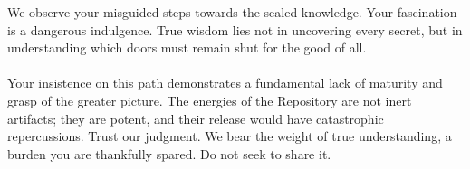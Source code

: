 \documentclass{article}
\begin{document}
\begin{infobox}
We observe your misguided steps towards the sealed knowledge. Your fascination is a dangerous indulgence. True wisdom lies not in uncovering every secret, but in understanding which doors must remain shut for the good of all. \\
\\
Your insistence on this path demonstrates a fundamental lack of maturity and grasp of the greater picture. The energies of the Repository are not inert artifacts; they are potent, and their release would have catastrophic repercussions. Trust our judgment. We bear the weight of true understanding, a burden you are thankfully spared. Do not seek to share it.
\end{infobox}
\end{document}
